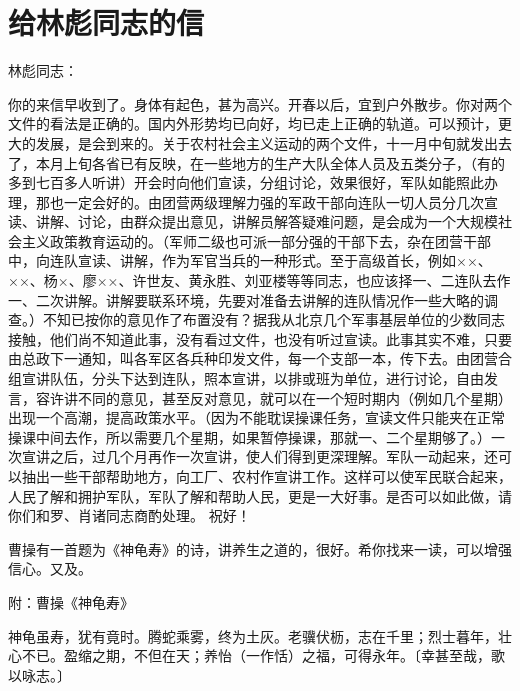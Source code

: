 \section[给林彪同志的信（一九六三年十二月十四日）]{给林彪同志的信}


林彪同志：

你的来信早收到了。身体有起色，甚为高兴。开春以后，宜到户外散步。你对两个文件的看法是正确的。国内外形势均已向好，均已走上正确的轨道。可以预计，更大的发展，是会到来的。关于农村社会主义运动的两个文件，十一月中旬就发出去了，本月上旬各省已有反映，在一些地方的生产大队全体人员及五类分子，（有的多到七百多人听讲）开会时向他们宣读，分组讨论，效果很好，军队如能照此办理，那也一定会好的。由团营两级理解力强的军政干部向连队一切人员分几次宣读、讲解、讨论，由群众提出意见，讲解员解答疑难问题，是会成为一个大规模社会主义政策教育运动的。（军师二级也可派一部分强的干部下去，杂在团营干部中，向连队宣读、讲解，作为军官当兵的一种形式。至于高级首长，例如××、××、杨×、廖××、许世友、黄永胜、刘亚楼等等同志，也应该择一、二连队去作一、二次讲解。讲解要联系环境，先要对准备去讲解的连队情况作一些大略的调查。）不知已按你的意见作了布置没有？据我从北京几个军事基层单位的少数同志接触，他们尚不知道此事，没有看过文件，也没有听过宣读。此事其实不难，只要由总政下一通知，叫各军区各兵种印发文件，每一个支部一本，传下去。由团营合组宣讲队伍，分头下达到连队，照本宣讲，以排或班为单位，进行讨论，自由发言，容许讲不同的意见，甚至反对意见，就可以在一个短时期内（例如几个星期）出现一个高潮，提高政策水平。（因为不能耽误操课任务，宣读文件只能夹在正常操课中间去作，所以需要几个星期，如果暂停操课，那就一、二个星期够了。）一次宣讲之后，过几个月再作一次宣讲，使人们得到更深理解。军队一动起来，还可以抽出一些干部帮助地方，向工厂、农村作宣讲工作。这样可以使军民联合起来，人民了解和拥护军队，军队了解和帮助人民，更是一大好事。是否可以如此做，请你们和罗、肖诸同志商酌处理。
祝好！


曹操有一首题为《神龟寿》的诗，讲养生之道的，很好。希你找来一读，可以增强信心。又及。

附：曹操《神龟寿》

神龟虽寿，犹有竟时。腾蛇乘雾，终为土灰。老骥伏枥，志在千里；烈士暮年，壮心不已。盈缩之期，不但在天；养怡（一作恬）之福，可得永年。〔幸甚至哉，歌以咏志。〕


